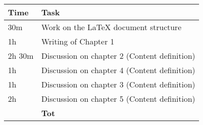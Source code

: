 \begin{center}
    {\renewcommand{\arraystretch}{2}%
    \begin{tabular}{L{2cm}L{12cm}}
        \hline
        \textbf{Time} & \textbf{Task} \\
        \hline
        30m & Work on the LaTeX document structure \\
        \hline
        1h & Writing of Chapter 1 \\
        \hline
        2h 30m & Discussion on chapter 2 (Content definition) \\
        \hline
        1h & Discussion on chapter 4 (Content definition) \\
        \hline
        1h & Discussion on chapter 3 (Content definition) \\
        \hline
        2h & Discussion on chapter 5 (Content definition) \\
        \hline
        \textbf{} & \textbf{Tot} \\
    \end{tabular}}
\end{center}